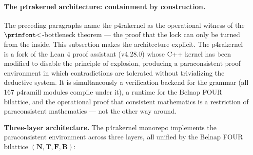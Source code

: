 \documentclass[12pt,a4paper]{article}
\makeatletter
\newcommand{\igprimfont}{\primfont}
\renewcommand{\_}{\ig@origunderscore\discretionary{}{}{}}
\makeatother
\begin{document}
\paragraph{The p4rakernel architecture: containment by construction.}
The preceding paragraphs name the p4rakernel as the operational witness of the
$\text{{\igprimfont <}}$-bottleneck theorem --- the proof that the lock can only be turned from the inside. This
subsection makes the architecture explicit. The p4rakernel is a fork of the Lean 4 proof assistant (v4.28.0) whose
C++ kernel has been modified to disable the principle of explosion, producing a paraconsistent proof environment in
which contradictions are tolerated without trivializing the deductive system. It is simultaneously a verification
backend for the grammar (all 167 p4ramill modules compile under it), a runtime for the Belnap FOUR bilattice, and the
operational proof that consistent mathematics is a restriction of paraconsistent mathematics --- not the other way
around.

\textbf{Three-layer architecture.} The p4rakernel monorepo implements the paraconsistent environment across three
layers, all unified by the Belnap FOUR bilattice $(\mathbf{N}, \mathbf{T}, \mathbf{F}, \mathbf{B})$:
\end{document}
